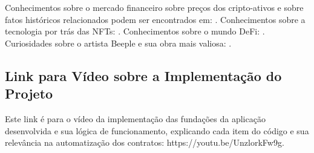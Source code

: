 \documentclass[onecolumn,12pt]{asme2ej}
\begin{document}
Conhecimentos sobre o mercado financeiro sobre preços dos cripto-ativos e sobre fatos históricos relacionados podem ser encontrados em: \cite{rrf1}\cite{rrf12}\cite{rrf8}\cite{rrf11}\cite{rrf4}. Conhecimentos sobre a tecnologia por trás das NFTs: \cite{rrf5}
\cite{rrf9}\cite{rrf7}. Conhecimentos sobre o mundo DeFi: \cite{rrf3}\cite{rrf6}. Curiosidades sobre o artista Beeple e sua obra mais valiosa: \cite{rrf2}.

\subsection{Link para Vídeo sobre a Implementação do Projeto}

Este link é para o vídeo da implementação das fundações da aplicação desenvolvida e sua lógica de funcionamento, explicando cada item do código e sua relevância na automatização dos contratos: https://youtu.be/UnzlorkFw9g.

\newpage
\printbibliography  
\end{document}
